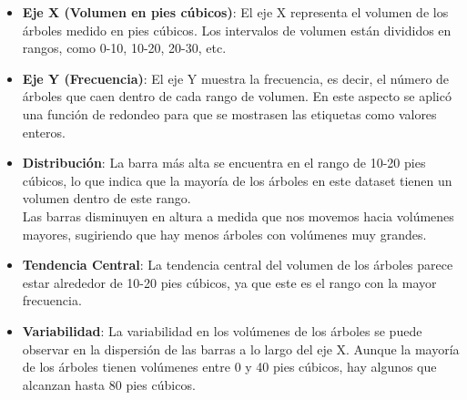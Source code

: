 \documentclass{article}
\begin{document}
\begin{itemize}
    \item \textbf{Eje X (Volumen en pies cúbicos)}: El eje X representa el volumen de los árboles medido en pies cúbicos. Los intervalos de volumen están divididos en rangos, como 0-10, 10-20, 20-30, etc.
    \item \textbf{Eje Y (Frecuencia)}: El eje Y muestra la frecuencia, es decir, el número de árboles que caen dentro de cada rango de volumen. En este aspecto se aplicó una función de redondeo para que se mostrasen las etiquetas como valores enteros.
    \item \textbf{Distribución}: La barra más alta se encuentra en el rango de 10-20 pies cúbicos, lo que indica que la mayoría de los árboles en este dataset tienen un volumen dentro de este rango.\\Las barras disminuyen en altura a medida que nos movemos hacia volúmenes mayores, sugiriendo que hay menos árboles con volúmenes muy grandes.
    \item \textbf{Tendencia Central}: La tendencia central del volumen de los árboles parece estar alrededor de 10-20 pies cúbicos, ya que este es el rango con la mayor frecuencia.
    \item \textbf{Variabilidad}: La variabilidad en los volúmenes de los árboles se puede observar en la dispersión de las barras a lo largo del eje X. Aunque la mayoría de los árboles tienen volúmenes entre 0 y 40 pies cúbicos, hay algunos que alcanzan hasta 80 pies cúbicos.
\end{itemize}
\end{document}
